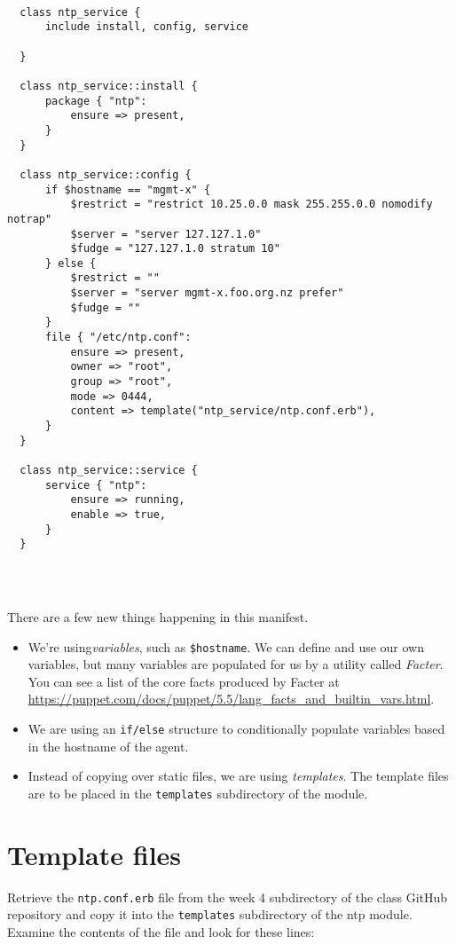 \documentclass{article}   	%
\begin{document}
\begin{verbatim}

  class ntp_service {
      include install, config, service

  }

  class ntp_service::install {
      package { "ntp":
          ensure => present,
      }
  }

  class ntp_service::config {
      if $hostname == "mgmt-x" {
          $restrict = "restrict 10.25.0.0 mask 255.255.0.0 nomodify notrap"
          $server = "server 127.127.1.0"
          $fudge = "127.127.1.0 stratum 10"
      } else {
          $restrict = ""
          $server = "server mgmt-x.foo.org.nz prefer"
          $fudge = ""
      }
      file { "/etc/ntp.conf":
          ensure => present,
          owner => "root",
          group => "root",
          mode => 0444,
          content => template("ntp_service/ntp.conf.erb"),
      }    
  }

  class ntp_service::service {
      service { "ntp":
          ensure => running,
          enable => true,
      }    
  }


  
\end{verbatim}



There are a few new things happening in this manifest.
\begin{itemize}
  \item We're using\emph{variables}, such as \texttt{\$hostname}.  We can define and use our own variables, but many variables are populated for us by a utility called \emph{Facter}.  You can see a list of the core facts produced by Facter at \url{https://puppet.com/docs/puppet/5.5/lang_facts_and_builtin_vars.html}.
  \item We are using an \texttt{if/else} structure to conditionally populate variables based in the hostname of the agent.
  \item Instead of copying over static files, we are using \emph{templates}.  The template files are to be placed in the \texttt{templates} subdirectory of the module.
\end{itemize}

\section{Template files}
Retrieve the \texttt{ntp.conf.erb} file from the week 4 subdirectory of the class GitHub repository and copy it into the \texttt{templates} subdirectory of the ntp module. Examine the contents of the file and look for these lines:
\end{document}
